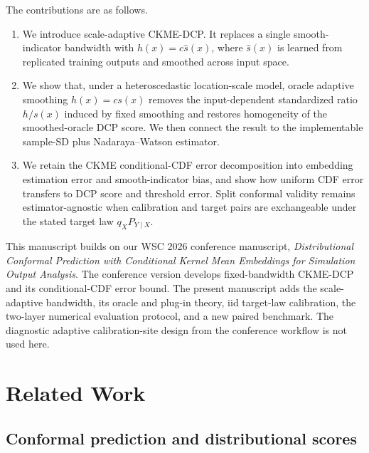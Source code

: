\documentclass[11pt]{article}
\newif\ifincludeexperiments
\begin{document}
The contributions are as follows.
\begin{enumerate}[leftmargin=1.7em]
  \item We introduce scale-adaptive CKME-DCP. It replaces a single smooth-indicator bandwidth with \(h(x)=c\widehat s(x)\), where \(\widehat s(x)\) is learned from replicated training outputs and smoothed across input space.
  \item We show that, under a heteroscedastic location-scale model, oracle adaptive smoothing \(h(x)=c s(x)\) removes the input-dependent standardized ratio \(h/s(x)\) induced by fixed smoothing and restores homogeneity of the smoothed-oracle DCP score. We then connect the result to the implementable sample-SD plus Nadaraya--Watson estimator.
  \item We retain the CKME conditional-CDF error decomposition into embedding estimation error and smooth-indicator bias, and show how uniform CDF error transfers to DCP score and threshold error. Split conformal validity remains estimator-agnostic when calibration and target pairs are exchangeable under the stated target law \(q_XP_{Y\mid X}\).
  \ifincludeexperiments
  \item We report a 50-macroreplication paired benchmark under iid target-law calibration. Oracle scaling substantially reduces the score-heterogeneity diagnostic on two raised-floor location-scale models, and the plug-in increasingly tracks the response scale, while the same benchmark identifies settings in which it does not improve interval score or groupwise coverage over fixed bandwidth.
  \fi
\end{enumerate}

This manuscript builds on our WSC 2026 conference manuscript, \emph{Distributional Conformal Prediction with Conditional Kernel Mean Embeddings for Simulation Output Analysis}. The conference version develops fixed-bandwidth CKME-DCP and its conditional-CDF error bound. The present manuscript adds the scale-adaptive bandwidth, its oracle and plug-in theory, iid target-law calibration, the two-layer numerical evaluation protocol, and a new paired benchmark. The diagnostic adaptive calibration-site design from the conference workflow is not used here.

\section{Related Work}
\label{sec:related}

\subsection{Conformal prediction and distributional scores}
\end{document}
